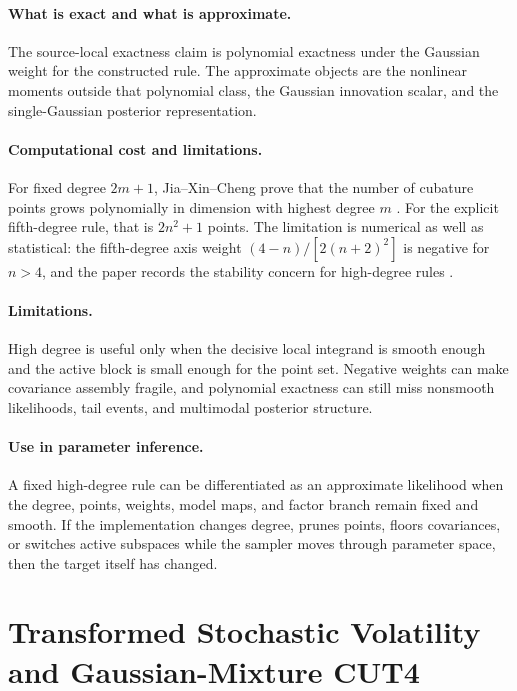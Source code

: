 \paragraph{What is exact and what is approximate.}
The source-local exactness claim is polynomial exactness under the Gaussian
weight for the constructed rule.  The approximate objects are the nonlinear
moments outside that polynomial class, the Gaussian innovation scalar, and the
single-Gaussian posterior representation.

\paragraph{Computational cost and limitations.}
For fixed degree \(2m+1\), Jia--Xin--Cheng prove that the number of cubature
points grows polynomially in dimension with highest degree \(m\)
\citep[Proposition 3.2]{jia2013highdegree}.  For the explicit fifth-degree
rule, that is \(2n^2+1\) points.  The limitation is numerical as well as
statistical: the fifth-degree axis weight
\((4-n)/[2(n+2)^2]\) is negative for \(n>4\), and the paper records the
stability concern for high-degree rules \citep[Remark 3.6]{jia2013highdegree}.

\paragraph{Limitations.}
High degree is useful only when the decisive local integrand is smooth enough
and the active block is small enough for the point set.  Negative weights can
make covariance assembly fragile, and polynomial exactness can still miss
nonsmooth likelihoods, tail events, and multimodal posterior structure.

\paragraph{Use in parameter inference.}
A fixed high-degree rule can be differentiated as an approximate likelihood
when the degree, points, weights, model maps, and factor branch remain fixed
and smooth.  If the implementation changes degree, prunes points, floors
covariances, or switches active subspaces while the sampler moves through
parameter space, then the target itself has changed.

\section{Transformed Stochastic Volatility and Gaussian-Mixture CUT4}
\label{sec:bf-hd-sv-mixture-cut4}

